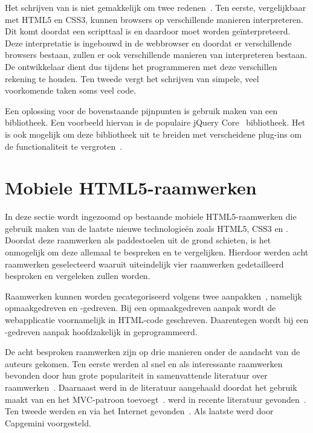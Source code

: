 Het schrijven van \js{} is niet gemakkelijk om twee redenen~\cite{McFarland2011}. 
Ten eerste, vergelijkbaar met HTML5 en CSS3, kunnen browsers \js{} op verschillende manieren interpreteren. 
Dit komt doordat \js{} een scripttaal is en daardoor moet worden geïnterpreteerd.
Deze interpretatie is ingebouwd in de webbrowser en doordat er verschillende browsers bestaan, zullen er ook verschillende manieren van interpreteren bestaan.
De ontwikkelaar dient dus tijdens het programmeren met deze verschillen rekening te houden. 
Ten tweede vergt het schrijven van simpele, veel voorkomende taken soms veel code.

Een oplossing voor de bovenstaande pijnpunten is gebruik maken van een bibliotheek. 
Een voorbeeld hiervan is de populaire jQuery Core~\cite{JQuery2013a} bibliotheek. 
Het is ook mogelijk om deze bibliotheek uit te breiden met verscheidene plug-ins om de functionaliteit te vergroten~\cite{McFarland2011}.


\section{Mobiele HTML5-raamwerken}
\label{sec:mobiele-html5-raamwerken}

In deze sectie wordt ingezoomd op bestaande mobiele HTML5-raamwerken die gebruik maken van de laatste nieuwe technologieën zoals HTML5, CSS3 en \js{}.
Doordat deze raamwerken als paddestoelen uit de grond schieten, is het onmogelijk om deze allemaal te bespreken en te vergelijken.
Hierdoor werden acht raamwerken geselecteerd waaruit uiteindelijk vier raamwerken gedetailleerd besproken en vergeleken zullen worden.

Raamwerken kunnen worden gecategoriseerd volgens twee aanpakken~\cite{Oeflman2011}, namelijk opmaakgedreven en \js{}-gedreven.
Bij een opmaakgedreven aanpak wordt de webapplicatie voornamelijk in HTML-code geschreven. 
Daarentegen wordt bij een \js{}-gedreven aanpak hoofdzakelijk in \js{} geprogrammeerd.

De acht besproken raamwerken zijn op drie manieren onder de aandacht van de auteurs gekomen.
Ten eerste werden al snel \jqm{} en \st{} als interessante raamwerken bevonden door hun grote populariteit in samenvattende literatuur over raamwerken~\cite{Firtman2013,Hales2012,Oeflman2011,David2011}.
Daarnaast werd \tmp{} in de literatuur aangehaald doordat het gebruik maakt van \jqm{} en het MVC-patroon toevoegt~\cite{Firtman2013}.
\lungo{} werd in recente literatuur gevonden~\cite{Firtman2013,Hales2012}.
Ten tweede werden \kendo{} en \moobile{} via het Internet gevonden~\cite{Bristowe2012}.
Als laatste werd \davinci{} door Capgemini voorgesteld.

